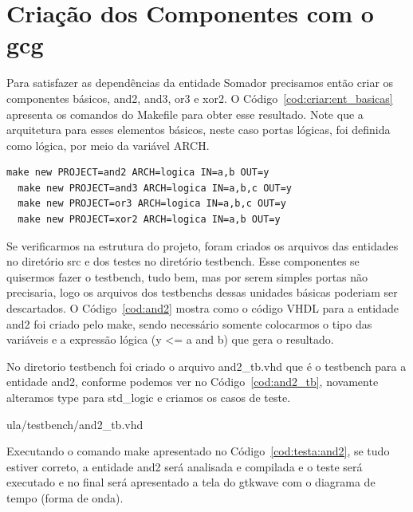 \documentclass[a4paper,11pt]{report}
\begin{document}
\section{Criação dos Componentes com o gcg}

Para satisfazer as dependências da entidade Somador precisamos então criar os componentes básicos, and2, and3, or3 e xor2. O Código~\ref{cod:criar:ent_basicas} apresenta os comandos do Makefile para obter esse resultado. Note que a arquitetura para esses elementos básicos, neste caso portas lógicas, foi definida como lógica, por meio da variável ARCH.

\lstset{numbers=left, numberstyle=\tiny, stepnumber=1, numbersep=3pt}
\begin{lstlisting}[label=cod:criar:ent_basicas,caption=Comandos para a criação das entidades básicas]
  make new PROJECT=and2 ARCH=logica IN=a,b OUT=y
  make new PROJECT=and3 ARCH=logica IN=a,b,c OUT=y
  make new PROJECT=or3 ARCH=logica IN=a,b,c OUT=y
  make new PROJECT=xor2 ARCH=logica IN=a,b OUT=y
\end{lstlisting}

Se verificarmos na estrutura do projeto, foram criados os arquivos das entidades no diretório src e dos testes no diretório testbench. Esse componentes se quisermos fazer o testbench, tudo bem, mas por serem simples portas não precisaria, logo os arquivos dos testbenchs dessas unidades básicas poderiam ser descartados.
O Código~\ref{cod:and2} mostra como o código VHDL para a entidade and2 foi criado pelo make, sendo necessário somente colocarmos o tipo das variáveis e a expressão lógica (y <= a and b) que gera o resultado.

\lstset{language=VHDL}
\lstset{numbers=left, numberstyle=\tiny, stepnumber=1, numbersep=3pt}


No diretorio testbench foi criado o arquivo and2\_tb.vhd que é o testbench para a entidade and2, conforme podemos ver no Código~\ref{cod:and2_tb}, novamente alteramos type para std\_logic e criamos os casos de teste.

\lstset{language=VHDL}
\lstset{numbers=left, numberstyle=\tiny, stepnumber=1, numbersep=3pt}
 {ula/testbench/and2_tb.vhd}

Executando o comando make apresentado no Código~\ref{cod:testa:and2}, se tudo estiver correto, a entidade and2 será analisada e compilada e o teste será executado e no final será apresentado a tela do gtkwave com o diagrama de tempo (forma de onda).
\end{document}
